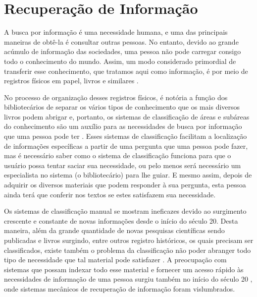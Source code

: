 \section{Recuperação de Informação} \label{sec:RecuperaçãoInformação}



    A busca por informação é uma necessidade humana, e uma das principais maneiras de obtê-la é consultar outras pessoas.
    No entanto, devido ao grande acúmulo de informação das sociedades, uma pessoa não pode carregar consigo todo o conhecimento do mundo.
    Assim, um modo considerado primordial de transferir esse conhecimento, que tratamos aqui como informação, é por meio de registros físicos em papel, livros e similares \cite[p.~1]{Grossman2004IRAH}.
    
    No processo de organização desses registros físicos, é notória a função dos bibliotecários de separar os vários tipos de conhecimento que os mais diversos livros podem abrigar e, portanto, os sistemas de classificação de áreas e subáreas do conhecimento são um auxílio para as necessidades de busca por informação que uma pessoa pode ter \cite[p.~1]{Manning2008IIR} \cite[p.~1446]{Sanderson2012THIRR} \cite[p.~6]{Baeza-Yates1999}. 
    Esses sistemas de classificação facilitam a localização de informações específicas a partir de uma pergunta que uma pessoa pode fazer, mas é necessário saber como o sistema de classificação funciona para que o usuário possa tentar saciar sua necessidade, ou pelo menos será necessário um especialista no sistema (o bibliotecário) para lhe guiar.
    E mesmo assim, depois de adquirir os diversos materiais que podem responder à sua pergunta, esta pessoa ainda terá que conferir nos textos se estes satisfazem sua necessidade.
    
    
    Os sistemas de classificação manual se mostram ineficazes devido ao surgimento crescente e constante de novas informações \cite[p.~6]{Baeza-Yates1999} desde o início do século 20. 
    Desta maneira, além da grande quantidade de novas pesquisas científicas sendo publicadas e livros surgindo, entre outros registro históricos, os quais precisam ser classificados, existe também o problema da classificação não poder abranger todo tipo de necessidade que tal material pode satisfazer \cite[p.~1444]{Sanderson2012THIRR}. 
    A preocupação com sistemas que possam indexar todo esse material e fornecer um acesso rápido às necessidades de informação de uma pessoa surgiu também no início do século 20 \cite{Bush:1979:WMT:1113634.1113638}, onde sistemas mecânicos de recuperação de informação foram vislumbrados.
    
